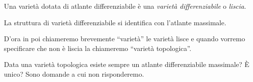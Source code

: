 \begin{defn}
	Una varietà dotata di atlante differenziabile è una \emph{varietà differenziabile} o \emph{liscia}.
\end{defn}

\begin{oss}
	La struttura di varietà differenziabile si identifica con l'atlante massimale.
\end{oss}

D'ora in poi chiameremo brevemente ``varietà'' le varietà lisce
e quando vorremo specificare che non è liscia la chiameremo ``varietà topologica''.

Data una varietà topologica esiste sempre un atlante differenziabile massimale? È unico?
Sono domande a cui non risponderemo.
